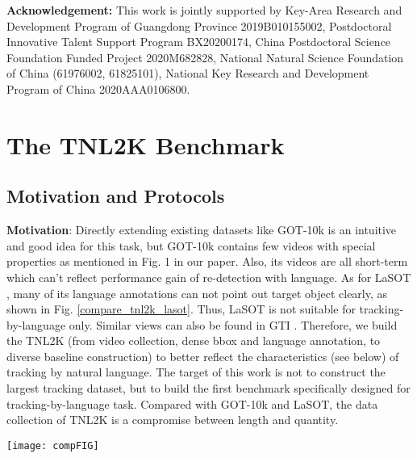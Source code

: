 \documentclass[final]{cvpr}
\begin{document}
\noindent \scriptsize{\textbf{Acknowledgement: } This work is jointly supported by Key-Area Research and Development Program of Guangdong Province 2019B010155002, Postdoctoral Innovative Talent Support Program BX20200174, China Postdoctoral Science Foundation Funded Project 2020M682828, National Natural Science Foundation of China (61976002, 61825101), National Key Research and Development Program of China 2020AAA0106800.}

 
 
\small{ 


}


\clearpage








\appendix


\section{The TNL2K Benchmark}    



\subsection{Motivation and Protocols} 
\textbf{Motivation}: Directly extending existing datasets like GOT-10k \cite{huang2019got10k} is an intuitive and good idea for this task, but GOT-10k contains few videos with special properties as mentioned in Fig. 1 in our paper. Also, its videos are all short-term which can't reflect performance gain of re-detection with language. As for LaSOT \cite{fan2019lasot}, many of its language annotations can not point out target object clearly, as shown in Fig. \ref{compare_tnl2k_lasot}. Thus, LaSOT is not suitable for tracking-by-language only. Similar views can also be found in GTI \cite{yang2019grounding}. Therefore, we build the TNL2K (from video collection, dense bbox and language annotation, to diverse baseline construction) to better reflect the characteristics (see below) of tracking by natural language. The target of this work is not to construct the largest tracking dataset, but to build the first benchmark specifically designed for tracking-by-language task. Compared with GOT-10k and LaSOT, the data collection of TNL2K is a compromise between length and quantity. 



\begin{figure*} 
\center
\texttt{[image: compFIG]}
\caption{Comparison between our proposed TNL2K dataset and existing LaSOT dataset. Best viewed by zooming in.} 
\label{compare_tnl2k_lasot}
\end{figure*} 	
\end{document}
